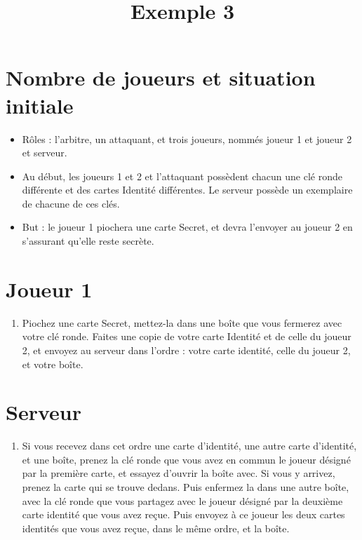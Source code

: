 \documentclass[a4paper,10pt]{article}
\title{Exemple 3}
\begin{document}
\maketitle

\section{Nombre de joueurs et situation initiale}
\begin{itemize}
	\item Rôles : l'arbitre, un attaquant, et trois joueurs, nommés joueur 1 et joueur 2 et serveur.
	\item Au début, les joueurs 1 et 2 et l'attaquant possèdent chacun une clé ronde différente et des cartes Identité différentes. Le serveur possède un exemplaire de chacune de ces clés.
	\item But : le joueur 1 piochera une carte Secret, et devra l'envoyer au joueur 2 en s'assurant qu'elle reste secrète.
\end{itemize}




\section{Joueur 1}
\begin{enumerate}
	\item Piochez une carte Secret, mettez-la dans une boîte que vous fermerez avec votre clé ronde. Faites une copie de votre carte Identité et de celle du joueur 2, et envoyez au serveur dans l'ordre : votre carte identité, celle du joueur 2, et votre boîte.
\end{enumerate}

\section{Serveur}
\begin{enumerate}
	\item Si vous recevez dans cet ordre une carte d'identité, une autre carte d'identité, et une boîte, prenez la clé ronde que vous avez en commun le joueur désigné par la première carte, et essayez d'ouvrir la boîte avec. Si vous y arrivez, prenez la carte qui se trouve dedans. Puis enfermez la dans une autre boîte, avec la clé ronde que vous partagez avec le joueur désigné par la deuxième carte identité que vous avez reçue. Puis envoyez à ce joueur les deux cartes identités que vous avez reçue, dans le même ordre, et la boîte.
\end{enumerate}
\end{document}
